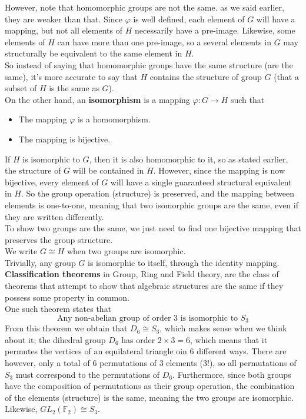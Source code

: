 \documentclass[12pt]{article}
\begin{document}
    However, note that homomorphic groups are not the same.
    as we said earlier, they are weaker than that.
    Since $\varphi$ is well defined,
    each element of $G$ will have a mapping,
    but not all elements of $H$ necessarily have a pre-image.
    Likewise, some elements of $H$ can have more than one pre-image,
    so a several elements in $G$ may structurally be equivalent
    to the same element in $H$. \\
    So instead of saying that homomorphic groups have the same structure
    (are the same),
    it's more accurate to say that
    $H$ contains the structure of group $G$
    (that a subset of $H$ is the same as $G$). \\

    On the other hand, an \textbf{isomorphism}
    is a mapping $\varphi: G \rightarrow H$ such that
    \begin{itemize}[label=$\diamond$]
        \item 
            The mapping $\varphi$ is a homomorphism.
        \item 
            The mapping is bijective.
    \end{itemize}
    If $H$ is isomorphic to $G$, then it is also homomorphic to it,
    so as stated earlier, the structure of $G$
    will be contained in $H$.
    However, since the mapping is now bijective,
    every element of $G$ will have a single guaranteed
    structural equivalent in $H$.
    So the group operation (structure) is preserved,
    and the mapping between elements is one-to-one,
    meaning that two isomorphic groups are the same,
    even if they are written differently. \\
    To show two groups are the same,
    we just need to find one bijective mapping
    that preserves the group structure. \\
    We write $G \cong H$ when two groups are isomorphic. \\

    Trivially, any group $G$ is isomorphic to itself,
    through the identity mapping. \\

    \textbf{Classification theorems} in Group, Ring and Field theory,
    are the class of theorems that attempt to show that
    algebraic structures are the same if they possess some
    property in common. \\
    One such theorem states that
    \[ \text{Any non-abelian group of order $3$ is isomorphic to $S_3$} \]
    From this theorem we obtain that $D_6 \cong S_3$,
    which makes sense when we think about it;
    the dihedral group $D_6$ has order $2 \times 3 = 6$,
    which means that it permutes the vertices of an equilateral triangle
    oin $6$ different ways.
    There are however,
    only a total of $6$ permutations of $3$ elements ($3!$),
    so all permutations of $S_3$
    must correspond to the permutations of $D_6$.
    Furthermore, since both groups have the composition of permutations
    as their group operation,
    the combination of the elements (structure) is the same,
    meaning the two groups are isomorphic. \\
    Likewise, $GL_2(\mathbb{F}_2) \cong S_3$. \\
\end{document}
